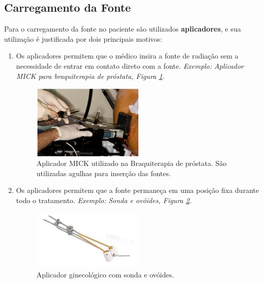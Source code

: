 \documentclass[11pt,a4paper]{article}
\begin{document}
		\subsection{Carregamento da Fonte}

			Para o carregamento da fonte no paciente são utilizados \textbf{aplicadores}, e sua utilização é justificada por dois principais motivos:

			\begin{enumerate}
				\item Os aplicadores permitem que o médico insira a fonte de radiação sem a necessidade de entrar em contato direto com a fonte. \textit{\textcolor{CarnationPink}{Exemplo:}} \textit{Aplicador MICK para braquiterapia de próstata, Figura \ref{img:aplicadorMick}.}

				\begin{figure}[h]
					\centering
					\includegraphics[width=0.5\textwidth]{Imagens/aplicadorMick.JPG}
					\caption{Aplicador MICK utilizado na Braquiterapia de próstata. São utilizadas agulhas para inserção das fontes.}
					\label{img:aplicadorMick}
				\end{figure}

				\item Os aplicadores permitem que a fonte permaneça em uma posição fixa durante todo o tratamento. \textit{\textcolor{CarnationPink}{Exemplo:}} \textit{Sonda e ovóides, Figura \ref{img:aplicadorSondaEOvoides}.}
				
				\begin{figure}[h]
					\centering
					\includegraphics[width=0.5\textwidth]{Imagens/aplicadorSondaEOvoides.jpg}
					\caption{Aplicador ginecológico com sonda e ovóides.}
					\label{img:aplicadorSondaEOvoides}
				\end{figure}
			\end{enumerate}
\end{document}
